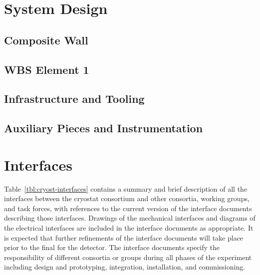 \section{System Design}
\label{sec:cryost-des}

\subsection{Composite Wall}
\label{sec:cryost-des-wall}

\subsection{WBS Element 1}
\label{sec:cryost-des-wbs1}


\subsection{Infrastructure and Tooling}
\label{sec:cryost-des-infr}

\subsection{Auxiliary Pieces and Instrumentation}
\label{sec:cryost-des-aux}

\section{Interfaces}
\label{sec:cryost-interface}

Table~\ref{tbl:cryost-interfaces} contains a summary and brief description of all the interfaces between the cryostat consortium and other consortia, working groups, and task forces, with references to the current version of the interface documents describing those interfaces.  
Drawings of the mechanical interfaces and diagrams of the electrical interfaces are 
included in the interface documents as appropriate.
It is expected that further refinements of the interface documents will take place prior to the final  for the detector. The interface documents specify the responsibility of different consortia or groups during all phases of the experiment including design and prototyping, integration,  installation, and  commissioning.


